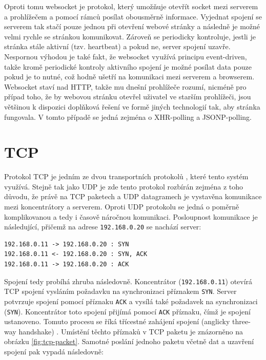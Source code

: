 Oproti tomu websocket \cite{rfc6455} je protokol, který umožňuje otevřít socket mezi serverem a prohlížečem a pomocí rámců posílat obousměrně informace. Vyjednat spojení se serverem tak stačí pouze jednou při otevření webové stránky a následně je možné velmi rychle se stránkou komunikovat. Zároveň se periodicky kontroluje, jestli je stránka stále aktivní (tzv. heartbeat) a pokud ne, server spojení uzavře. Nespornou výhodou je také fakt, že websocket využívá principu event-driven, takže kromě periodické kontroly aktivního spojení je možné posílat data pouze pokud je to nutné, což hodně ušetří na komunikaci mezi serverem a browserem. Websocket staví nad HTTP, takže mu dnešní prohlížeče rozumí, nicméně pro případ toho, že by webovou stránku otevřel uživatel ve starším prohlížeči, jsou většinou k dispozici doplňková řešení ve formě jiných technologií tak, aby stránka fungovala. V tomto případě se jedná zejména o XHR-polling a JSONP-polling.

\section{TCP}
Protokol TCP je jedním ze dvou transportních protokolů \cite{mistrovstvi}, které tento systém využívá. Stejně tak jako UDP je zde tento protokol rozbírán zejména z toho důvodu, že právě na TCP paketech a UDP datagramech je vystavěna komunikace mezi koncentrátory a serverem. Oproti UDP protokolu se jedná o poměrně komplikovanou a tedy i časově náročnou komunikaci. Posloupnost komunikace je následující, přičemž na adrese \texttt{192.168.0.20} se  nachází server:

\begin{verbatim}
192.168.0.11 -> 192.168.0.20 : SYN
192.168.0.11 <- 192.168.0.20 : SYN, ACK
192.168.0.11 -> 192.168.0.20 : ACK
\end{verbatim}

Spojení tedy probíhá zhruba následovně. Koncentrátor (\texttt{192.168.0.11}) otevírá TCP spojení vysláním požadavku na synchronizaci příznakem \texttt{SYN}. Server potvrzuje spojení pomocí příznaku \texttt{ACK} a vysílá také požadavek na synchronizaci (\texttt{SYN}). Koncentrátor toto spojení přijímá pomocí \texttt{ACK} příznaku, čímž je spojení ustanoveno. Tomuto procesu se říká třícestné zahájení spojení (anglicky three-way handshake) \cite{mistrovstvi}. Umístění těchto příznaků v TCP paketu je znázorněno na obrázku \ref{fig:tcp-packet}. Samotné poslání jednoho paketu včetně dat a uzavření spojení pak vypadá následovně:

